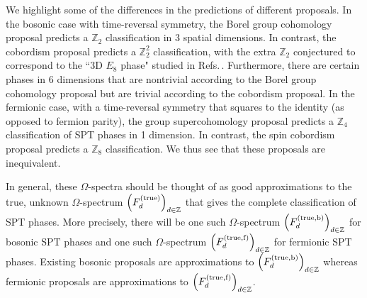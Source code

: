 \documentclass[sort&compress]{elsarticle}
\theoremstyle{theoremstyle}
\theoremstyle{framedtheoremstyle}
\theoremstyle{definitionstyle}
\theoremstyle{definitionstyle}
\theoremstyle{definitionstyle}
\theoremstyle{definitionstyle}
\theoremstyle{nameddefinitionstyle}
\theoremstyle{framednameddefinitionstyle}
\theoremstyle{proofstyle}
\theoremstyle{definitionstyle}
\newcommand{\ZZZ}{\mathbb{Z}}
\newcommand{\isomorphic}{\cong}
\newcommand{\paren}[1]{\left( #1 \right)}
\begin{document}
We highlight some of the differences in the predictions of different proposals. In the bosonic case with time-reversal symmetry, the Borel group cohomology proposal \cite{Wen_Boson} predicts a $\ZZZ_2$ classification in 3 spatial dimensions. In contrast, the cobordism proposal \cite{Kapustin_Boson} predicts a $\ZZZ_2^2$ classification, with the extra $\ZZZ_2$ conjectured to correspond to the ``3D $E_8$ phase" studied in Refs.\,\cite{3dBTScVishwanathSenthil, 3dBTScWangSenthil, 3dBTScBurnell}. Furthermore, there are certain phases in 6 dimensions that are nontrivial according to the Borel group cohomology proposal but are trivial according to the cobordism proposal. In the fermionic case, with a time-reversal symmetry that squares to the identity (as opposed to fermion parity), the group supercohomology proposal \cite{Wen_Fermion} predicts a $\ZZZ_4$ classification of SPT phases in 1 dimension. In contrast, the spin cobordism \cite{Kapustin_Fermion} proposal predicts a $\ZZZ_8$ classification. We thus see that these proposals are inequivalent.

In general, these $\Omega$-spectra should be thought of as good approximations to the true, unknown $\Omega$-spectrum $\paren{F^{\rm (true)}_d}_{d\in \ZZZ}$ that gives the complete classification of SPT phases. More precisely, there will be one such $\Omega$-spectrum $\paren{F^{\rm (true,b)}_d}_{d\in \ZZZ}$ for bosonic SPT phases and one such $\Omega$-spectrum $\paren{F^{\rm (true,f)}_d}_{d\in \ZZZ}$ for fermionic SPT phases. Existing bosonic proposals are approximations to $\paren{F^{\rm (true,b)}_d}_{d\in \ZZZ}$ whereas fermionic proposals are approximations to $\paren{F^{\rm (true,f)}_d}_{d\in \ZZZ}$.




\end{document}
